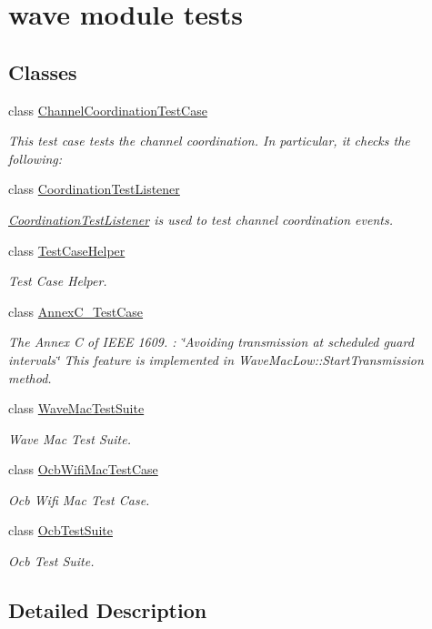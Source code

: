 \hypertarget{group__wave-test}{}\section{wave module tests}
\label{group__wave-test}
\subsection*{Classes}
\begin{DoxyCompactItemize}
\item 
class \hyperlink{classChannelCoordinationTestCase}{Channel\+Coordination\+Test\+Case}
\begin{DoxyCompactList}\small\item\em This test case tests the channel coordination. In particular, it checks the following\+: \end{DoxyCompactList}\item 
class \hyperlink{classCoordinationTestListener}{Coordination\+Test\+Listener}
\begin{DoxyCompactList}\small\item\em \hyperlink{classCoordinationTestListener}{Coordination\+Test\+Listener} is used to test channel coordination events. \end{DoxyCompactList}\item 
class \hyperlink{classTestCaseHelper}{Test\+Case\+Helper}
\begin{DoxyCompactList}\small\item\em Test Case Helper. \end{DoxyCompactList}\item 
class \hyperlink{classAnnexC__TestCase}{Annex\+C\+\_\+\+Test\+Case}
\begin{DoxyCompactList}\small\item\em The Annex C of I\+E\+EE 1609. \+: \char`\"{}\+Avoiding transmission at scheduled guard intervals\char`\"{} This feature is implemented in Wave\+Mac\+Low\+::\+Start\+Transmission method. \end{DoxyCompactList}\item 
class \hyperlink{classWaveMacTestSuite}{Wave\+Mac\+Test\+Suite}
\begin{DoxyCompactList}\small\item\em Wave Mac Test Suite. \end{DoxyCompactList}\item 
class \hyperlink{classOcbWifiMacTestCase}{Ocb\+Wifi\+Mac\+Test\+Case}
\begin{DoxyCompactList}\small\item\em Ocb Wifi Mac Test Case. \end{DoxyCompactList}\item 
class \hyperlink{classOcbTestSuite}{Ocb\+Test\+Suite}
\begin{DoxyCompactList}\small\item\em Ocb Test Suite. \end{DoxyCompactList}\end{DoxyCompactItemize}


\subsection{Detailed Description}
